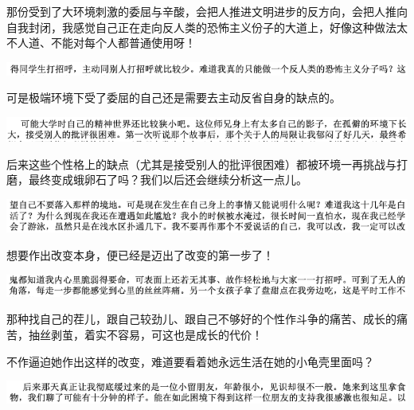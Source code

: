 \documentclass[9pt, b5paper]{article}
\begin{document}
那份受到了大环境刺激的委屈与辛酸，会把人推进文明进步的反方向，会把人推向自我封闭，我感觉自己正在走向反人类的恐怖主义份子的大道上，好像这种做法太不人道、不能对每个人都普通使用呀！

\begin{center}
\includegraphics[width=.9\linewidth]{./pic/backups_plans_20210503_222258.png}
\end{center}

可是极端环境下受了委屈的自己还是需要去主动反省自身的缺点的。 

\begin{center}
\includegraphics[width=.9\linewidth]{./pic/backups_plans_20210503_222332.png}
\end{center}

后来这些个性格上的缺点（尤其是接受别人的批评很困难）都被环境一再挑战与打磨，最终变成蛾卵石了吗？我们以后还会继续分析这一点儿。 

\begin{center}
\includegraphics[width=.9\linewidth]{./pic/backups_plans_20210503_222647.png}
\end{center}

想要作出改变本身，便已经是迈出了改变的第一步了！

\begin{center}
\includegraphics[width=.9\linewidth]{./pic/backups_plans_20210503_222749.png}
\end{center}

那种找自己的茬儿，跟自己较劲儿、跟自己不够好的个性作斗争的痛苦、成长的痛苦，抽丝剥茧，着实不容易，可这也是成长的代价！

不作逼迫她作出这样的改变，难道要看着她永远生活在她的小龟壳里面吗？

\begin{center}
\includegraphics[width=.9\linewidth]{./pic/backups_plans_20210503_222916.png}
\end{center}
\end{document}
